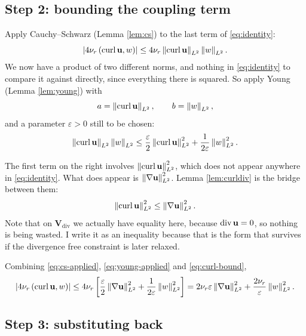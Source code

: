 \documentclass[11pt,a4paper]{article}
\begin{document}
\subsection{Step 2: bounding the coupling term}

Apply Cauchy--Schwarz (Lemma \ref{lem:cs}) to the last term of
\eqref{eq:identity}:
\begin{equation}\label{eq:cs-applied}
  \left\lvert 4\nu_{r}\left( \operatorname{curl} \mathbf{u} , w \right) \right\rvert
  \le 4\nu_{r} \left\lVert \operatorname{curl} \mathbf{u} \right\rVert_{L^{2}} \left\lVert w \right\rVert_{L^{2}} .
\end{equation}
We now have a product of two different norms, and nothing in
\eqref{eq:identity} to compare it against directly, since everything there is
squared. So apply Young (Lemma \ref{lem:young}) with
\[
  a = \left\lVert \operatorname{curl} \mathbf{u} \right\rVert_{L^{2}}, \qquad b = \left\lVert w \right\rVert_{L^{2}},
\]
and a parameter $\varepsilon > 0$ still to be chosen:
\begin{equation}\label{eq:young-applied}
  \left\lVert \operatorname{curl} \mathbf{u} \right\rVert_{L^{2}}\left\lVert w \right\rVert_{L^{2}}
  \le \frac{\varepsilon}{2}\left\lVert \operatorname{curl} \mathbf{u} \right\rVert_{L^{2}}^{2}
  + \frac{1}{2\varepsilon}\left\lVert w \right\rVert_{L^{2}}^{2} .
\end{equation}

The first term on the right involves $\left\lVert \operatorname{curl} \mathbf{u} \right\rVert_{L^{2}}^{2}$, which does not
appear anywhere in \eqref{eq:identity}. What does appear is
$\left\lVert \nabla \mathbf{u} \right\rVert_{L^{2}}^{2}$. Lemma \ref{lem:curldiv} is the bridge between them:
\begin{equation}\label{eq:curl-bound}
  \left\lVert \operatorname{curl} \mathbf{u} \right\rVert_{L^{2}}^{2} \le \left\lVert \nabla \mathbf{u} \right\rVert_{L^{2}}^{2} .
\end{equation}
Note that on $\mathbf{V}_{\mathrm{div}}$ we actually have equality here, because
$\operatorname{div} \mathbf{u} = 0$, so nothing is being wasted. I write it as an inequality because
that is the form that survives if the divergence free constraint is later
relaxed.

Combining \eqref{eq:cs-applied}, \eqref{eq:young-applied} and
\eqref{eq:curl-bound},
\begin{equation}\label{eq:coupling-bound}
  \left\lvert 4\nu_{r}\left( \operatorname{curl} \mathbf{u} , w \right) \right\rvert
  \le 4\nu_{r}\left[
    \frac{\varepsilon}{2}\left\lVert \nabla \mathbf{u} \right\rVert_{L^{2}}^{2}
    + \frac{1}{2\varepsilon}\left\lVert w \right\rVert_{L^{2}}^{2}
  \right]
  = 2\nu_{r}\varepsilon \left\lVert \nabla \mathbf{u} \right\rVert_{L^{2}}^{2}
  + \frac{2\nu_{r}}{\varepsilon}\left\lVert w \right\rVert_{L^{2}}^{2} .
\end{equation}

\subsection{Step 3: substituting back}
\end{document}
